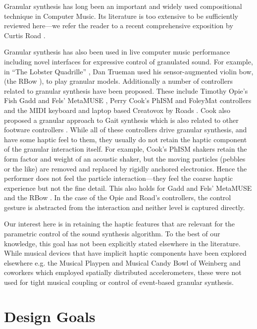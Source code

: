 Granular synthesis has long been an important and widely used compositional technique in Computer Music. Its literature is too extensive to be sufficiently reviewed here---we refer the reader to a recent comprehensive exposition by Curtis Road \cite{Roads:2001}.

Granular synthesis has also been used in live computer music performance including novel interfaces for expressive control of granulated sound. For example, in ``The Lobster Quadrille'' \cite{Trueman:1999a}, Dan Trueman used his sensor-augmented violin bow, (the RBow \cite{Trueman:1999}), to play granular models. Additionally a number of controllers related to granular synthesis have been proposed. These include Timothy Opie's Fish \cite{Opie:2002,Opie:2003} Gadd and Fels' MetaMUSE \cite{Gadd:2002}, Perry Cook's PhISM and FoleyMat controllers \cite{Cook:1999b,Cook:2002} and the MIDI keyboard and laptop based Creatovox by Roads  \cite{Roads:2001}. Cook also proposed a granular approach to Gait synthesis \cite{Cook:2002} which is also related to other footware controllers \cite{Paradiso:1997a}.  While all of these controllers drive granular synthesis, and have some haptic feel to them, they usually do not retain the haptic component of the granular interaction itself. For example, Cook's PhISM shakers retain the form factor and weight of an acoustic shaker, but the moving particles (pebbles or the like) are removed and replaced by rigidly anchored electronics. Hence the performer does not feel the particle interaction---they feel the coarse haptic experience but not the fine detail. This also holds for Gadd and Fels' MetaMUSE \cite{Gadd:2002} and the RBow \cite{Trueman:1999}. In the case of the Opie and Road's controllers, the control gesture is abstracted from the interaction and neither level is captured directly.

Our interest here is in retaining the haptic features that are relevant for the parametric control of the sound synthesis algorithm.  To the best of our knowledge, this goal has not been explicitly stated elsewhere in the literature.  While musical devices that have implicit haptic components have been explored elsewhere e.g. the Musical Playpen and Musical Candy Bowl of  Weinberg and coworkers \cite{Weinberg:1999,Weinberg:1999a} which employed spatially distributed accelerometers, these were not used for tight musical
coupling or control of event-based granular synthesis. 

\section{Design Goals}

